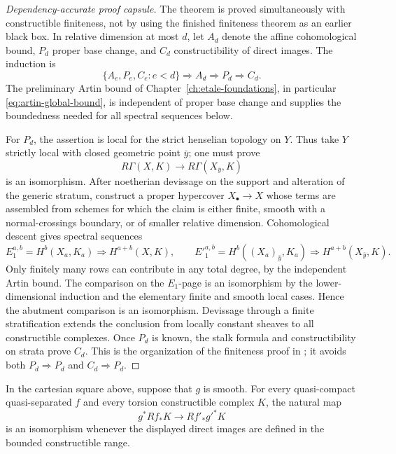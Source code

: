 \begin{proof}[Dependency-accurate proof capsule]
The theorem is proved simultaneously with constructible finiteness, not by
using the finished finiteness theorem as an earlier black box.  In relative
dimension at most \(d\), let \(A_d\) denote the affine cohomological bound,
\(P_d\) proper base change, and \(C_d\) constructibility of direct images.
The induction is
\[
  \{A_e,P_e,C_e:e<d\}\Longrightarrow A_d
  \Longrightarrow P_d\Longrightarrow C_d.
\]
The preliminary Artin bound of Chapter~\ref{ch:etale-foundations}, in
particular \eqref{eq:artin-global-bound}, is independent of proper base change
and supplies the boundedness needed for all spectral sequences below.

For \(P_d\), the assertion is local for the strict henselian topology on
\(Y\).  Thus take \(Y\) strictly local with closed geometric point \(\bar y\);
one must prove
\[
  R\Gamma(X,K)\longrightarrow R\Gamma(X_{\bar y},K)
\]
is an isomorphism.  After noetherian devissage on the support and alteration
of the generic stratum, construct a proper hypercover
\(X_\bullet\to X\) whose terms are assembled from schemes for which the
claim is either finite, smooth with a normal-crossings boundary, or of smaller
relative dimension.  Cohomological descent gives spectral sequences
\[
 E_1^{a,b}=H^b(X_a,K_a)\Rightarrow H^{a+b}(X,K),
\qquad
 {E'}_1^{a,b}=H^b((X_a)_{\bar y},K_a)
 \Rightarrow H^{a+b}(X_{\bar y},K).
\]
Only finitely many rows can contribute in any total degree, by the independent
Artin bound.  The comparison on the \(E_1\)-page is an isomorphism by the
lower-dimensional induction and the elementary finite and smooth local
cases.  Hence the abutment comparison is an isomorphism.  Devissage through a
finite stratification extends the conclusion from locally constant sheaves to
all constructible complexes.  Once \(P_d\) is known, the stalk formula and
constructibility on strata prove \(C_d\).  This is the organization of the
finiteness proof in \cite[Expos\'es XIV--XVI]{SGA4}; it avoids both
\(P_d\Rightarrow P_d\) and \(C_d\Rightarrow P_d\).
\end{proof}

\begin{theorem}
\label{thm:smooth-base-change}
In the cartesian square above, suppose that \(g\) is smooth.  For every
quasi-compact quasi-separated \(f\) and every torsion constructible complex
\(K\), the natural map
\[
  g^*Rf_*K\longrightarrow Rf'_*g'^*K
\]
is an isomorphism whenever the displayed direct images are defined in the
bounded constructible range.
\end{theorem}

